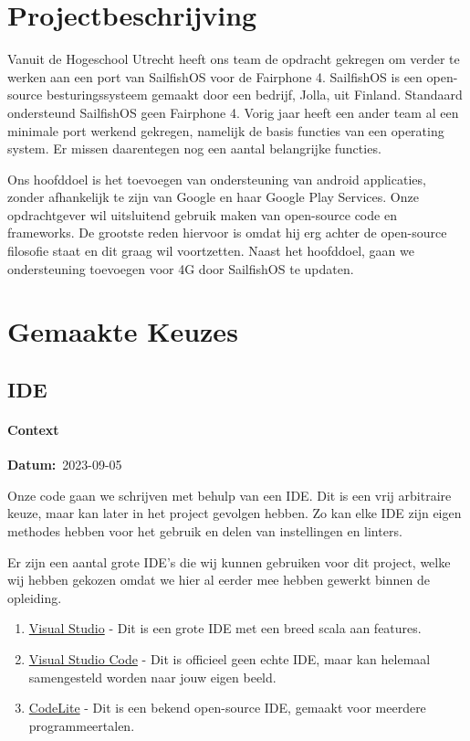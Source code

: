 \documentclass[a4paper]{report}
\newcommand{\personalbox}{
  \begin{tcolorbox}[hbox, colback=green!5!white,colframe=green!75!black,
    left=.1mm, right=.1mm, top=.1mm, bottom=.1mm, fontupper=\scriptsize\sffamily]
    Persoonlijke Keuze
  \end{tcolorbox}
}
\newcommand{\personalchoice}[1]{
  \section[ #1 ]{#1~\mbox{\raisebox{-2.5pt}{\personalbox}}}
}
\newcommand{\timestamp}[1]{
  \mbox{\scriptsize \textbf{Datum:} #1} \smallbreak
}
\begin{document}
\chapter{Projectbeschrijving}
Vanuit de Hogeschool Utrecht heeft ons team de opdracht gekregen om verder te werken aan een port van SailfishOS voor de Fairphone 4.
SailfishOS is een open-source besturingssysteem gemaakt door een bedrijf, Jolla, uit Finland. Standaard ondersteund SailfishOS geen Fairphone 4.
Vorig jaar heeft een ander team al een minimale port werkend gekregen, namelijk de basis functies van een operating system. Er missen daarentegen nog een aantal belangrijke functies.
\par \smallskip
Ons hoofddoel is het toevoegen van ondersteuning van android applicaties, zonder afhankelijk te zijn van Google en haar Google Play Services\texttrademark. 
Onze opdrachtgever wil uitsluitend gebruik maken van open-source code en frameworks. De grootste reden hiervoor is omdat hij erg achter de open-source filosofie staat en dit graag wil voortzetten.
Naast het hoofddoel, gaan we ondersteuning toevoegen voor 4G door SailfishOS te updaten.
\endgroup

\chapter{Gemaakte Keuzes}
\personalchoice{IDE}
\subsubsection{Context}
\timestamp{2023-09-05}
Onze code gaan we schrijven met behulp van een IDE. Dit is een vrij arbitraire keuze, maar kan later in het project gevolgen hebben. 
Zo kan elke IDE zijn eigen methodes hebben voor het gebruik en delen van instellingen en linters. 
\par\smallskip
Er zijn een aantal grote IDE's die wij kunnen gebruiken voor dit project, welke wij hebben gekozen omdat we hier al eerder mee hebben gewerkt binnen de opleiding.
\begin{enumerate}
  \item \href{https://visualstudio.microsoft.com/}{Visual Studio} - Dit is een grote IDE met een breed scala aan features.
  \item \href{https://code.visualstudio.com/}{Visual Studio Code} - Dit is officieel geen echte IDE, maar kan helemaal samengesteld worden naar jouw eigen beeld.
  \item \href{https://codelite.org/}{CodeLite} - Dit is een bekend open-source IDE, gemaakt voor meerdere programmeertalen.
\end{enumerate}
\end{document}
